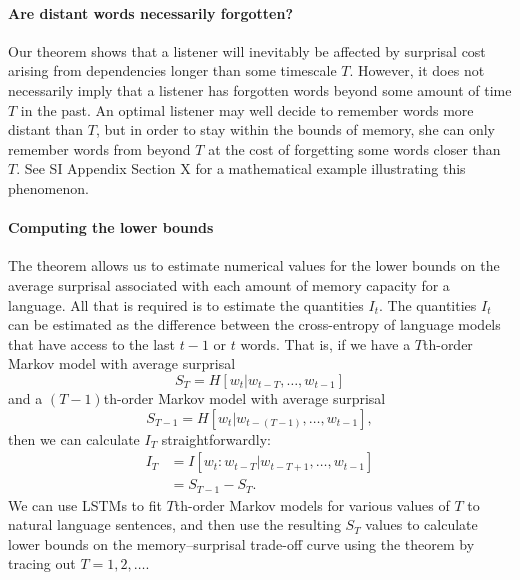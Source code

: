 \paragraph{Are distant words necessarily forgotten?} Our theorem shows that a listener will inevitably be affected by surprisal cost arising from dependencies longer than some timescale $T$. However, it does not necessarily imply that a listener has forgotten words beyond some amount of time $T$ in the past. An optimal listener may well decide to remember words more distant than $T$, but in order to stay within the bounds of memory, she can only remember words from beyond $T$ at the cost of forgetting some words closer than $T$.
See SI Appendix Section X for a mathematical example illustrating this phenomenon.


\paragraph{Computing the lower bounds}
The theorem allows us to estimate numerical values for the lower bounds on the average surprisal associated with each amount of memory capacity for a language.
All that is required is to estimate the quantities $I_t$.
The quantities $I_t$ can be estimated as the difference between the cross-entropy of language models that have access to the last $t-1$ or $t$ words.
That is, if we have a $T$th-order Markov model with average surprisal
\begin{equation}
    S_T = H[w_t | w_{t-T}, \dots, w_{t-1}]
\end{equation}
and a $(T-1)$th-order Markov model with average surprisal
\begin{equation}
    S_{T-1} = H[w_t | w_{t-(T-1)}, \dots, w_{t-1}],
\end{equation}
then we can calculate $I_T$ straightforwardly:
\begin{align}
    I_T &= I[w_t : w_{t-T} | w_{t-T+1}, \dots, w_{t-1}] \\
    &= S_{T-1} - S_T.
\end{align}
We can use LSTMs to fit $T$th-order Markov models for various values of $T$ to natural language sentences, and then use the resulting $S_T$ values to calculate lower bounds on the memory--surprisal trade-off curve using the theorem by tracing out $T=1, 2, \dots$.



